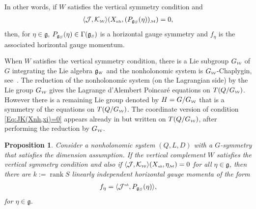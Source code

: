 \documentclass[pdftex]{sigma}
\numberwithin{equation}{section}
\newtheorem{Proposition}[Theorem]{Proposition}
 { \theoremstyle{definition}
\newtheorem{Definition}[Theorem]{Definition}
\newtheorem{Example}[Theorem]{Example}
\newtheorem{Remark}[Theorem]{Remark}
\newtheorem{Remarks}[Theorem]{Remarks} }
\def\W{\mathcal{W}}
\def\M{\mathcal{M}}
\def\J{\mathcal{J}}
\def\g{\mathfrak{g}}
\def\nh{{\mbox{\tiny{nh}}}}
\def\subW{{\mbox{\tiny{$\W$}}}}
\def\subM{{\mbox{\tiny{$\M$}}}}
\def\subSS{{\mbox{\tiny{$S$}}}}
\def\subWW{{\mbox{\tiny{$W$}}}}
\begin{document}
In other words, if $W$ satisf\/ies the
 vertical symmetry condition and
 \begin{gather}\label{Eq:JK(Xnh,xi)=0}
 \langle \mathcal{J},\mathcal{K}_\subW\rangle (X_{\nh},( P_{\mathfrak{g}_S}(\eta))_\subM ) = 0,
 \end{gather}
 then, for $\eta\in \mathfrak{g}$,  $P_{\mathfrak{g}_S}(\eta) \in \Gamma(\mathfrak{g}_\subSS)$
 is a horizontal gauge symmetry and $f_\eta$ is  the associated horizontal gauge momentum.

\begin{Remark}
 When $W$ satisf\/ies the vertical symmetry condition, there is a Lie subgroup $G_\subW$ of $G$ integrating the Lie algebra $\mathfrak{g}_\subWW$ and the nonholonomic system is $G_\subW$-Chaplygin, see~\cite{BF2015}.  The reduction of the nonholonomic system (on the Lagrangian side) by the Lie group $G_\subW$ gives the Lagrange d'Alembert Poincar\'e equations on $T(Q/G_\subW)$. However there is a remaining Lie group denoted by $H = G/G_\subW$ that is a symmetry of the equations on $T(Q/G_\subW)$.
 The coordinate version of condition \eqref{Eq:JK(Xnh,xi)=0} appears already in \cite[Theorem~6]{Zenkov} but written on $T(Q/G_\subW)$, after performing the reduction by $G_\subW$.
 \end{Remark}

\begin{Proposition}\label{P:RankS}
 Consider a nonholonomic system $(Q,L,D)$ with a $G$-symmetry that sa\-tis\-fies
 the dimension assumption. If the vertical complement $W$ satisfies the vertical
 symmetry condition and also if $\langle \J,\mathcal{K}_\subW\rangle(X_{\emph\nh}, \eta_\subM) = 0$
 for all $\eta\in \g$, then  there are $k:= \operatorname{rank} S$ linearly independent
 horizontal gauge momenta of the form
 \begin{gather}\label{Eq:f_eta}
   f_\eta = \langle \J^{\emph\nh}, P_{\g_S}(\eta)\rangle,
 \end{gather}
 for $\eta\in \g$.
\end{Proposition}
\end{document}
